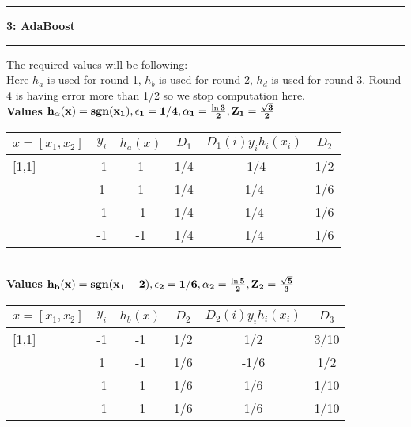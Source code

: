 \documentclass[11pt]{article}
\newcommand\question[2]{\vspace{.25in}\hrule\textbf{#1: #2}\vspace{.5em}\hrule\vspace{.10in}}
\begin{document}
\question{3}{AdaBoost}
The required values will be following:\\[15pt]
Here $h_a$ is used for round 1, $h_b$ is used for round 2, $h_d$ is used for round 3. Round 4 is having error more than 1/2 so we stop computation here.\\
{\bf Values $ \bf h_\alpha({\bf x}) = sgn(x_{1}), \epsilon_1 = 1/4, \alpha_{1} = \frac{\ln3}{2}, Z_{1} = \frac{\sqrt{3}}{2}$}\\
\bgroup 
\def\arraystretch{1.8}
\begin{tabular}{|l|c|c|c|c|c|} \hline 
{\bf \underline {$x=[x_{1},x_{2}]$}} & {\bf \underline {$y_i$}} & {\bf \underline {$ h_{a}(x)$}} & {\bf \underline {$D_1$}} & {\bf \underline {$D_{1}(i)y_{i}h_{i}(x_{i})$}} & {\bf \underline {$D_{2}$}}\\ \hline

 [1,1]  & -1  & 1& 1/4 & -1/4 &  1/2     \\ \hline
    [1,-1] &1 & 1 & 1/4 & 1/4 &    1/6   \\ \hline
    [-1,-1]        &     -1  & -1    & 1/4   & 1/4                           &    1/6   \\ \hline
    [-1,1]         &     -1 & -1    & 1/4   & 1/4                           &   1/6    \\ \hline
\end{tabular}
\egroup\\[15pt]

{\bf Values $\bf h_{b}({\bf x}) = sgn(x_1-2), \epsilon_2 = 1/6, \alpha_2 = \frac{\ln5}{2}, Z_2 = \frac{\sqrt{5}}{3}$}
\bgroup 
\def\arraystretch{1.8}
\begin{tabular}{|l|c|c|c|c|c|} \hline 
{\bf \underline {$x=[x_{1},x_{2}]$}} & {\bf \underline {$y_i$}} & {\bf \underline {$ h_{b}(x)$}} & {\bf \underline {$D_2$}} & {\bf \underline {$D_{2}(i)y_{i}h_{i}(x_{i})$}} & {\bf \underline {$D_{3}$}}\\ \hline

[1,1]          &     -1  & -1    & 1/2   &  1/2                         &  3/10     \\ \hline
    [1,-1]         &    1   & -1    & 1/6   & -1/6                           &1/2       \\ \hline
    [-1,-1]        &     -1  & -1    & 1/6   & 1/6                           &  1/10     \\ \hline
    [-1,1]         &     -1 & -1    & 1/6   & 1/6                           &   1/10    \\ \hline\end{tabular}
\egroup\\[15pt]
\end{document}
